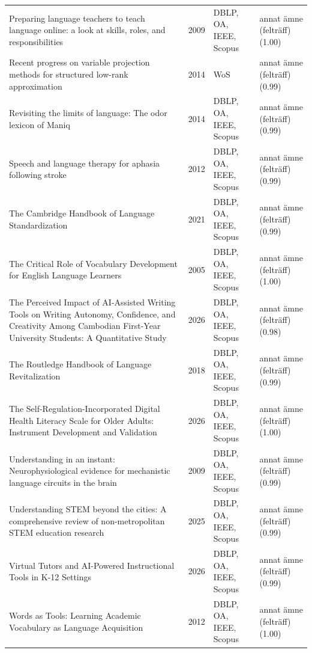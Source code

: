 \begin{longtable}{@{}%
  >{\raggedright\arraybackslash}p{}c%
  >{\raggedright\arraybackslash}p{}%
  >{\raggedright\arraybackslash}p{}@{}}
Preparing language teachers to teach language online: a look at skills, roles, and responsibilities & 2009 & DBLP, OA, IEEE, Scopus & annat ämne (felträff) (1.00) \\
Recent progress on variable projection methods for structured low-rank approximation & 2014 & WoS & annat ämne (felträff) (0.99) \\
Revisiting the limits of language: The odor lexicon of Maniq & 2014 & DBLP, OA, IEEE, Scopus & annat ämne (felträff) (0.99) \\
Speech and language therapy for aphasia following stroke & 2012 & DBLP, OA, IEEE, Scopus & annat ämne (felträff) (0.99) \\
The Cambridge Handbook of Language Standardization & 2021 & DBLP, OA, IEEE, Scopus & annat ämne (felträff) (0.99) \\
The Critical Role of Vocabulary Development for English Language Learners & 2005 & DBLP, OA, IEEE, Scopus & annat ämne (felträff) (1.00) \\
The Perceived Impact of AI-Assisted Writing Tools on Writing Autonomy, Confidence, and Creativity Among Cambodian First-Year University Students: A Quantitative Study & 2026 & DBLP, OA, IEEE, Scopus & annat ämne (felträff) (0.98) \\
The Routledge Handbook of Language Revitalization & 2018 & DBLP, OA, IEEE, Scopus & annat ämne (felträff) (0.99) \\
The Self-Regulation-Incorporated Digital Health Literacy Scale for Older Adults: Instrument Development and Validation & 2026 & DBLP, OA, IEEE, Scopus & annat ämne (felträff) (1.00) \\
Understanding in an instant: Neurophysiological evidence for mechanistic language circuits in the brain & 2009 & DBLP, OA, IEEE, Scopus & annat ämne (felträff) (0.99) \\
Understanding STEM beyond the cities: A comprehensive review of non-metropolitan STEM education research & 2025 & DBLP, OA, IEEE, Scopus & annat ämne (felträff) (0.99) \\
Virtual Tutors and AI-Powered Instructional Tools in K-12 Settings & 2026 & DBLP, OA, IEEE, Scopus & annat ämne (felträff) (0.99) \\
Words as Tools: Learning Academic Vocabulary as Language Acquisition & 2012 & DBLP, OA, IEEE, Scopus & annat ämne (felträff) (1.00) \\
\end{longtable}
\endgroup
